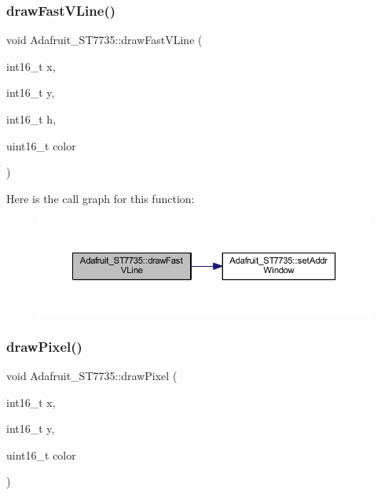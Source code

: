 \subsubsection{\texorpdfstring{draw\+Fast\+V\+Line()}{drawFastVLine()}}
{\footnotesize\ttfamily void Adafruit\+\_\+\+S\+T7735\+::draw\+Fast\+V\+Line (\begin{DoxyParamCaption}\item[{int16\+\_\+t}]{x,  }\item[{int16\+\_\+t}]{y,  }\item[{int16\+\_\+t}]{h,  }\item[{uint16\+\_\+t}]{color }\end{DoxyParamCaption})}

Here is the call graph for this function\+:\nopagebreak
\begin{figure}[H]
\begin{center}
\leavevmode
\includegraphics[width=350pt]{class_adafruit___s_t7735_a38de2e08911db493eb243ce2691e9c3a_cgraph}
\end{center}
\end{figure}
\mbox{\label{class_adafruit___s_t7735_af22a5ba7282850793f4943ba2d682af0}} 
\subsubsection{\texorpdfstring{draw\+Pixel()}{drawPixel()}}
{\footnotesize\ttfamily void Adafruit\+\_\+\+S\+T7735\+::draw\+Pixel (\begin{DoxyParamCaption}\item[{int16\+\_\+t}]{x,  }\item[{int16\+\_\+t}]{y,  }\item[{uint16\+\_\+t}]{color }\end{DoxyParamCaption})\hspace{0.3cm}{\ttfamily [virtual]}}



